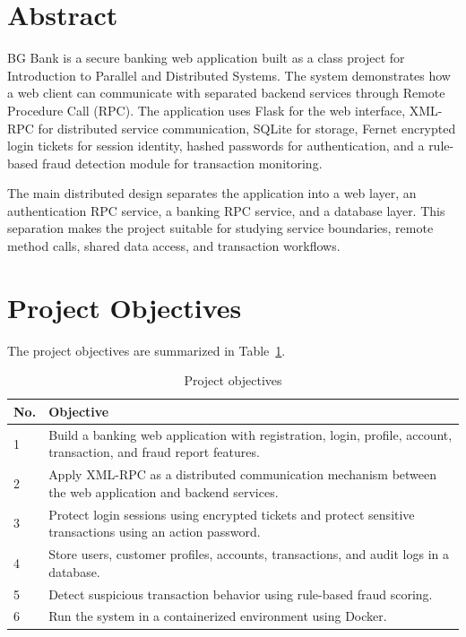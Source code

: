 \documentclass[12pt,a4paper]{article}
\newcommand{\sectionbreakguard}{\Needspace{8\baselineskip}}
\begin{document}
\tableofcontents
\newpage

\sectionbreakguard
\section{Abstract}

BG Bank is a secure banking web application built as a class project for Introduction to Parallel and Distributed Systems. The system demonstrates how a web client can communicate with separated backend services through Remote Procedure Call (RPC). The application uses Flask for the web interface, XML-RPC for distributed service communication, SQLite for storage, Fernet encrypted login tickets for session identity, hashed passwords for authentication, and a rule-based fraud detection module for transaction monitoring.

The main distributed design separates the application into a web layer, an authentication RPC service, a banking RPC service, and a database layer. This separation makes the project suitable for studying service boundaries, remote method calls, shared data access, and transaction workflows.

\sectionbreakguard
\section{Project Objectives}

The project objectives are summarized in Table~\ref{tab:project-objectives}.

\begin{longtable}{|p{1.2cm}|p{12.8cm}|}
\caption{Project objectives}\label{tab:project-objectives}\\
\hline
\textbf{No.} & \textbf{Objective} \\
\hline
1 & Build a banking web application with registration, login, profile, account, transaction, and fraud report features. \\
\hline
2 & Apply XML-RPC as a distributed communication mechanism between the web application and backend services. \\
\hline
3 & Protect login sessions using encrypted tickets and protect sensitive transactions using an action password. \\
\hline
4 & Store users, customer profiles, accounts, transactions, and audit logs in a database. \\
\hline
5 & Detect suspicious transaction behavior using rule-based fraud scoring. \\
\hline
6 & Run the system in a containerized environment using Docker. \\
\hline
\end{longtable}
\end{document}
